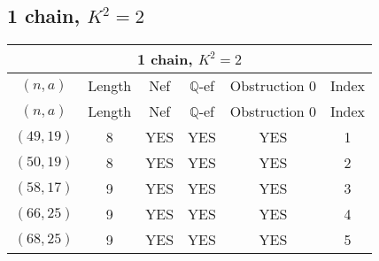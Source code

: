 \subsection{1 chain, \(K^2 = 2\)}
\begin{longtable}{|c|c|c|c|c|c|}
\hline
\multicolumn{6}{|c|}{1 chain, $K^2 = 2$}\\
\hline
$(n,a)$ & Length & Nef & $\mathbb Q$-ef & Obstruction 0 & Index\\
\hline
\endfirsthead

\hline
$(n,a)$ & Length & Nef & $\mathbb Q$-ef & Obstruction 0 & Index\\
\hline
\endhead
\hline
\endfoot

$(49, 19)$ & 8 & YES & YES & YES & 1\\
$(50, 19)$ & 8 & YES & YES & YES & 2\\
$(58, 17)$ & 9 & YES & YES & YES & 3\\
$(66, 25)$ & 9 & YES & YES & YES & 4\\
$(68, 25)$ & 9 & YES & YES & YES & 5
\end{longtable}
